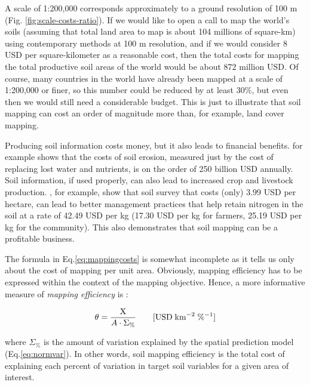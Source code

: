 \documentclass[11pt]{krantz}
\theoremstyle{definition}
\theoremstyle{definition}
\theoremstyle{definition}
\theoremstyle{remark}
\begin{document}
A scale of 1:200,000 corresponds approximately to a ground resolution of
100 m (Fig. \ref{fig:scale-costs-ratio}). If we would like to open a
call to map the world's soils (assuming that total land area to map is
about 104 millions of square-km) using contemporary methods at 100 m
resolution, and if we would consider 8 USD per square-kilometer as a
reasonable cost, then the total costs for mapping the total productive
soil areas of the world would be about 872 million USD. Of course, many
countries in the world have already been mapped at a scale of 1:200,000
or finer, so this number could be reduced by at least 30\%, but even
then we would still need a considerable budget. This is just to
illustrate that soil mapping can cost an order of magnitude more than,
for example, land cover mapping.

Producing soil information costs money, but it also leads to financial
benefits. \citet{Pimentel2006Springer} for example shows that the costs
of soil erosion, measured just by the cost of replacing lost water and
nutrients, is on the order of 250 billion USD annually. Soil
information, if used properly, can also lead to increased crop and
livestock production. \citet{Carrick2010WCSS}, for example, show that
soil survey that costs (only) 3.99 USD per hectare, can lead to better
management practices that help retain nitrogen in the soil at a rate of
42.49 USD per kg (17.30 USD per kg for farmers, 25.19 USD per kg for the
community). This also demonstrates that soil mapping can be a profitable
business.

The formula in Eq.\eqref{eq:mappingcosts} is somewhat incomplete as it
tells us only about the cost of mapping per unit area. Obviously,
mapping efficiency has to be expressed within the context of the mapping
objective. Hence, a more informative measure of \emph{mapping
efficiency} is \citep{Hengl2013JAG}:

\begin{equation}
\theta  = \frac{{\rm X}}{{A \cdot {\Sigma}_{\%}}} \qquad [{\rm USD} \; {\rm km}^{-2} \; \%^{-1} ]
\label{eq:efficiency}
\end{equation}

where \({\Sigma}_{\%}\) is the amount of variation explained by the
spatial prediction model (Eq.\eqref{eq:normvar}). In other words, soil
mapping efficiency is the total cost of explaining each percent of
variation in target soil variables for a given area of interest.
\end{document}
